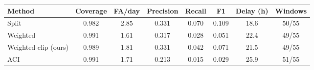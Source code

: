 \begin{tabular}{lccccccc}
\toprule
Method & Coverage & FA/day & Precision & Recall & F1 & Delay (h) & Windows \\
\midrule
Split & 0.982 & 2.85 & 0.331 & 0.070 & 0.109 & 18.6 & 50/55 \\
Weighted & 0.991 & 1.61 & 0.317 & 0.028 & 0.051 & 22.4 & 49/55 \\
Weighted-clip (ours) & 0.989 & 1.81 & 0.331 & 0.042 & 0.071 & 21.5 & 49/55 \\
ACI & 0.991 & 1.71 & 0.213 & 0.015 & 0.029 & 25.9 & 51/55 \\
\bottomrule
\end{tabular}
